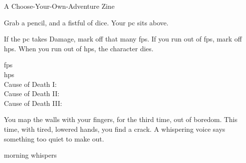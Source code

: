 \documentclass[10pt,twoside]{book}
\begin{document}
%
  {
    \vfill
    A Choose-Your-Own-Adventure Zine
  }


\randomCYOAcharacter{}

\noindent
Grab a pencil, and a fistful of dice.
Your \gls{pc} sits above.

If the \gls{pc} takes Damage, mark off that many \glspl{fp}.
If you run out of \glspl{fp}, mark off \glspl{hp}.
When you run out of \glspl{hp}, the character dies.

\begin{description}
  \item[\Glspl{fp}]
  \fpStat
  \item[\Glspl{hp}]
  \hpStat
  \item[Cause of Death I:]
  \bigLine
  \item[Cause of Death II:]
  \bigLine
  \item[Cause of Death III:]
  \bigLine
\end{description}

\pagebreak

\pagestyle{minizine}


You map the walls with your fingers, for the third time, out of boredom.
This time, with tired, lowered hands, you find a crack.
A whispering voice says something too quiet to make out.

\begin{selectPath}
  {}%
  {morning}
  {}%
  {whispers}
\end{selectPath}
\end{document}
